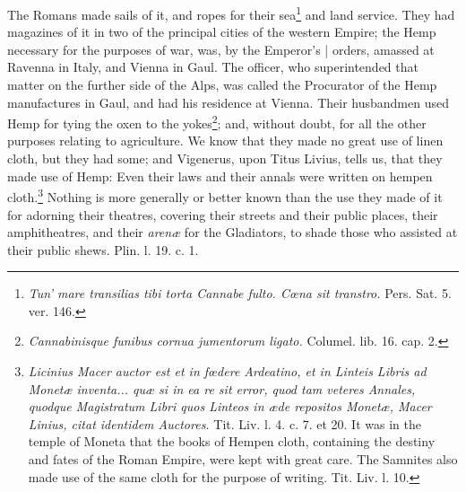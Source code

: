 \documentclass[a4paper, 11pt, oneside, polutonikogreek, english]{article}
\begin{document}
The Romans made sails of it, and ropes for their sea\footnote{\emph{Tun' mare transilias tibi torta Cannabe fulto. Cœna sit transtro.} Pers. Sat. 5. ver. 146.} and land service. They had magazines of it in two of the principal cities of the western Empire; the Hemp necessary for the purposes of war, was, by the Emperor's | orders, amassed at Ravenna in Italy, and Vienna in Gaul. The officer, who superintended that matter on the further side of the Alps, was called the Procurator of the Hemp manufactures in Gaul, and had his residence at Vienna. Their husbandmen used Hemp for tying the oxen to the yokes\footnote{\emph{Cannabinisque funibus cornua jumentorum ligato.} Columel. lib. 16. cap. 2.}; and, without doubt, for all the other purposes relating to agriculture. We know that they made no great use of linen cloth, but they had some; and Vigenerus, upon Titus Livius, tells us, that they made use of Hemp: Even their laws and their annals were written on hempen cloth.\footnote{\emph{Licinius Macer auctor est et in fœdere Ardeatino, et in Linteis Libris ad Monetæ inventa... quæ si in ea re sit error, quod tam veteres Annales, quodque Magistratum Libri quos Linteos in æde repositos Monetæ, Macer Linius, citat identidem Auctores.} Tit. Liv. l. 4. c. 7. et 20.  It was in the temple of Moneta that the books of Hempen cloth, containing the destiny and fates of the Roman Empire, were kept with great care.  
The Samnites also made use of the same cloth for the purpose of writing. Tit. Liv. l. 10.} Nothing is more generally or better known than the use they made of it for adorning their theatres, covering their streets and their public places, their amphitheatres, and their \emph{arenæ} for the Gladiators, to shade those who assisted at their public shews. Plin. l. 19. c. 1.
\end{document}
